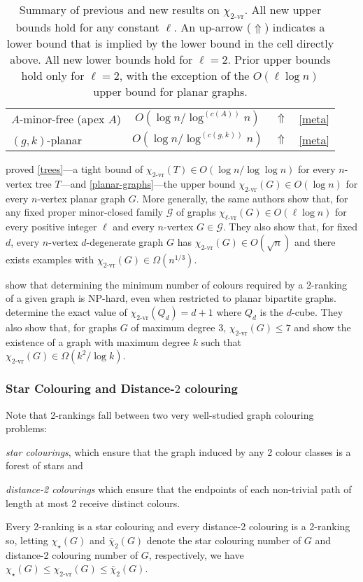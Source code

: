 \documentclass[kpfonts]{patmorin}
\newcommand{\rn}[1]{\chi_{\operatorname{#1-vr}}}
\newcommand{\trn}{\rn{2}}
\newcommand{\lrn}{\rn{\ell}}
\newcommand{\dtcn}{\bar{\chi}_2}
\newcommand{\scn}{\chi_{\star}}
\theoremstyle{named}
\begin{document}
\begin{table}
{\begin{tabular}{|l|c|c|l|}
            $A$-minor-free (apex $A$) & $O(\log n/\log^{(c(A))} n)$ & $\Uparrow$ & \cref{meta} \\
            $(g,k)$-planar & $O(\log n/\log^{(c(g,k))} n)$ & $\Uparrow$  & \cref{meta} \\
            \hline
        \end{tabular}
    } %
    \caption{Summary of previous and new results on $\trn$.  All new upper bounds hold for any constant $\ell$. An up-arrow ($\Uparrow$) indicates a lower bound that is implied by the lower bound in the cell directly above. All new lower bounds hold for $\ell=2$. Prior upper bounds hold only for $\ell=2$, with the exception of the $O(\ell\log n)$ upper bound for planar graphs.}
\label{summary-table}
\end{table}

\citet{karpas.neiman.ea:on} proved \cref{trees}---a tight bound of $\trn(T)\in O(\log n/\log\log n)$ for every $n$-vertex tree $T$---and \cref{planar-graphs}---the upper bound $\trn(G)\in O(\log n)$ for every $n$-vertex planar graph $G$.  More generally, the same authors show that, for any fixed proper minor-closed family $\mathcal{G}$ of graphs $\lrn(G)\in O(\ell\log n)$ for every positive integer $\ell$ and every $n$-vertex $G\in\mathcal{G}$.  They also show that, for fixed $d$, every $n$-vertex $d$-degenerate graph $G$ has $\trn(G)\in O(\sqrt{n})$ and there exists examples with $\trn(G)\in\Omega(n^{1/3})$.

\citet{shalu.antony:complexity} show that determining the minimum number of colours required by a 2-ranking of a given graph is NP-hard, even when restricted to planar bipartite graphs.  \citet{almeter.demircan.ea:graph} determine the exact value of $\trn(Q_d)=d+1$ where $Q_d$ is the $d$-cube.  They also show that, for graphs $G$ of maximum degree 3, $\trn(G)\le 7$ and show the existence of a graph with maximum degree $k$ such that $\trn(G)\in\Omega(k^2/\log k)$.

\subsubsection{Star Colouring and Distance-$2$ colouring}

 Note that 2-rankings fall between two very well-studied graph colouring problems:
\begin{compactitem}
    \item \emph{star colourings}, which ensure that the graph induced by any 2 colour classes is a forest of stars and
    \item \emph{distance-2 colourings} which ensure that the endpoints of each non-trivial path of length at most 2 receive distinct colours.
\end{compactitem}
Every 2-ranking is a star colouring and every distance-2 colouring is a 2-ranking so, letting $\scn(G)$ and $\dtcn(G)$ denote the star colouring number of $G$ and distance-2 colouring number of $G$, respectively, we have $\scn(G) \le \trn(G)\le \dtcn(G)$.
\end{document}
